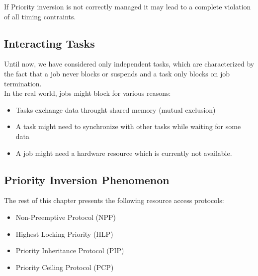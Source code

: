 If Priority inversion is not correctly managed it may lead to a complete violation of all timing contraints.
\subsection{Interacting Tasks}
Until now, we have considered only independent tasks, which are characterized by the fact that a job never blocks or suspends and a task only blocks on job termination.\\
In the real world, jobs might block for various reasons:
\begin{itemize}
    \item Tasks exchange data throught shared memory (mutual exclusion)
    \item A task might need to synchronize with other tasks while waiting for some data
    \item A job might need a hardware resource which is currently not available.
\end{itemize}


\subsection{Priority Inversion Phenomenon}

The rest of this chapter presents the following resource access protocols:
\begin{itemize}
    \item Non-Preemptive Protocol (NPP)
    \item Highest Locking Priority (HLP)
    \item Priority Inheritance Protocol (PIP)
    \item Priority Ceiling Protocol (PCP)
\end{itemize}


